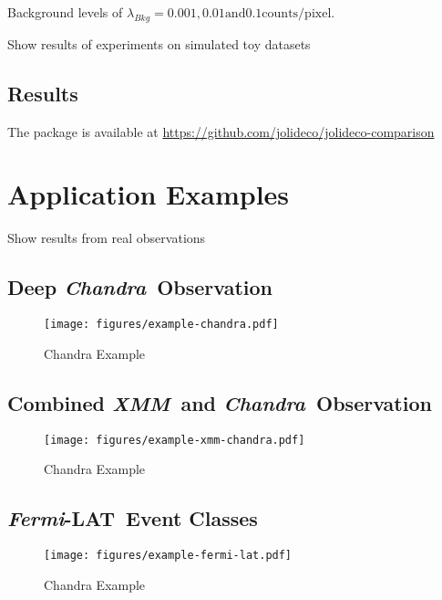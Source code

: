 \documentclass[twocolumn]{aastex631}
\newcommand{\chandra}{\textit{Chandra}~}
\newcommand{\xmm}{\textit{XMM}~}
\newcommand{\fermi}{\textit{Fermi}-LAT~}
\begin{document}
    Background levels of $\lambda_{Bkg}= 0.001, 0.01 \textrm{and} 0.1 \textrm{counts/pixel}$. 
    
    Show results of experiments on simulated toy datasets

    

    \subsection{Results}

    The package is available at \url{https://github.com/jolideco/jolideco-comparison}


    \section{Application Examples}
    Show results from real observations

    \subsection{Deep \chandra Observation}
    \begin{figure}[ht!]
        \begin{centering}
            \texttt{[image: figures/example-chandra.pdf]}
            \caption{
                Chandra Example
            }
            \label{fig:example-chandra}
        \end{centering}
    \end{figure}

    \subsection{Combined \xmm and \chandra Observation}
    \begin{figure}[ht!]
        \begin{centering}
            \texttt{[image: figures/example-xmm-chandra.pdf]}
            \caption{
                Chandra Example
            }
            \label{fig:example-xmm-chandra}
        \end{centering}
    \end{figure}


    \subsection{\fermi Event Classes}
    \begin{figure}[ht!]
        \begin{centering}
            \texttt{[image: figures/example-fermi-lat.pdf]}
            \caption{
                Chandra Example
            }
            \label{fig:example-fermi-lat}
        \end{centering}
    \end{figure}
\end{document}
